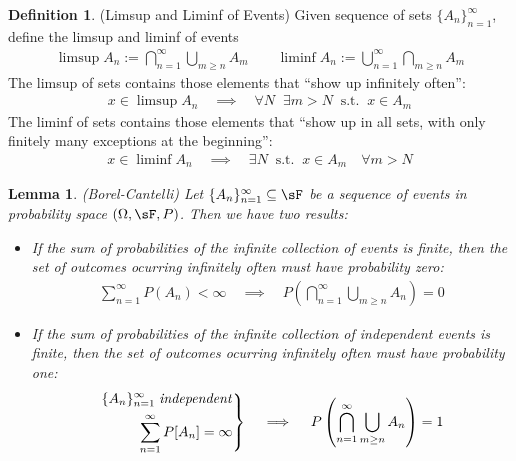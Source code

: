 \documentclass[12pt]{article}
\theoremstyle{plain}
\newtheorem{lem}[thm]{Lemma}
\theoremstyle{definition}
\newtheorem{defn}[thm]{Definition}
\theoremstyle{remark}
\newenvironment{rcases}
  {\left.\begin{aligned}}
  {\end{aligned}\right\rbrace}
\newcommand{\sumninf}{\sum^\infty_{n=1}}
\newcommand{\ninf}{_{n=1}^\infty}
\begin{document}
\begin{defn}(Limsup and Liminf of Events)
Given sequence of sets $\{A_n\}\ninf$, define the limsup and liminf of
events
\begin{align*}
  \limsup A_n := \bigcap\ninf \bigcup_{m \geq n} A_m
  \qquad
  \liminf A_n := \bigcup\ninf \bigcap_{m \geq n} A_m
\end{align*}
The limsup of sets contains those elements that ``show up infinitely
often'':
\begin{align*}
  x\in \limsup A_n
  \quad\implies\quad
  \forall N
  \;\; \exists m>N
  \;\; \text{s.t.}
  \;\; x\in A_m
\end{align*}
The liminf of sets contains those elements that ``show up in all sets,
with only finitely many exceptions at the beginning'':
\begin{align*}
  x\in \liminf A_n
  \quad\implies\quad
  \exists N
  \;\; \text{s.t.}\;\;
  x \in A_m
  \quad \forall m>N
\end{align*}
\end{defn}

\begin{lem}\emph{(Borel-Cantelli)}
Let $\{A_n\}\ninf\subseteq\sF$ be a sequence of events in probability
space $(\Omega,\sF,P)$. Then we have two results:
\begin{itemize}
  \item
    If the sum of probabilities of the infinite collection of events
    is finite, then the set of outcomes ocurring infinitely often must
    have probability zero:
    \begin{align*}
      \sumninf P(A_n) < \infty
      \quad\implies\quad
      P\left(\bigcap\ninf \bigcup_{m\geq n} A_n\right) = 0
    \end{align*}

  \item
    If the sum of probabilities of the infinite collection of
    independent events is finite, then the set of outcomes ocurring
    infinitely often must have probability one:
    \begin{align*}
      \begin{rcases}
        \{A_n\}\ninf \; \text{\emph{independent}}\\
        \sumninf P[A_n] = \infty
      \end{rcases}
      \quad\implies\quad
      P\left(\bigcap\ninf \bigcup_{m\geq n} A_n\right) = 1
    \end{align*}
\end{itemize}
\end{lem}
\end{document}
